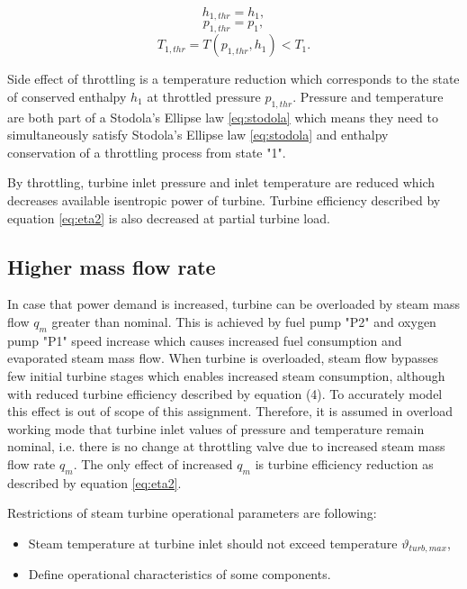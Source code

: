 \documentclass{article}
\begin{document}
	\begin{equation}\label{eq:ent_preserve1}
		h_{1,thr} = h_1,
	\end{equation}
	\begin{equation}\label{eq:ent_preserve2}
	p_{1,thr} = p_1,
	\end{equation}
	\begin{equation}\label{eq:ent_preserve3}
	T_{1,thr} = T(p_{1,thr},h_1) < T_1.
	\end{equation}
	
	Side effect of throttling is a temperature reduction which corresponds to the state of conserved enthalpy $h_1$ at throttled pressure $p_{1,thr}$. Pressure and temperature are both part of a Stodola’s Ellipse law \ref{eq:stodola} which means they need to simultaneously satisfy Stodola’s Ellipse law  \ref{eq:stodola}  and enthalpy conservation of a throttling process from state "1".
	
	By throttling, turbine inlet pressure and inlet temperature are reduced which decreases available isentropic power of turbine. Turbine efficiency described by equation \ref{eq:eta2} is also decreased at partial turbine load.
	
	\subsection*{Higher mass flow rate}
	
	In case that power demand is increased, turbine can be overloaded by steam mass flow $q_m$ greater than nominal. This is achieved by fuel pump "P2" and oxygen pump "P1" speed increase which causes increased fuel consumption and evaporated steam mass flow. When turbine is overloaded, steam flow bypasses few initial turbine stages which enables increased steam consumption, although with reduced turbine efficiency described by equation (4). To accurately model this effect is out of scope of this assignment. Therefore, it is assumed in overload working mode that turbine inlet values of pressure and temperature remain nominal, i.e. there is no change at throttling valve due to increased steam mass flow rate $q_m$. The only effect of increased $q_m$ is turbine efficiency reduction as described by equation \ref{eq:eta2}.
	
	Restrictions of steam turbine operational parameters are following:
	
	\begin{itemize}
		\item Steam temperature at turbine inlet should not exceed temperature $\vartheta_{turb,max}$,
		\item Define operational characteristics of some components.
	\end{itemize}
	
\end{document}

